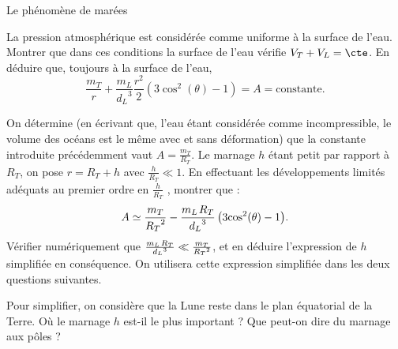 \begin{exo}[PC][1][devoir]{Le phénomène de marées}
\begin{quest}
  \item
  La pression atmosphérique est considérée comme uniforme à la surface de l'eau. Montrer que dans ces conditions la surface de l'eau vérifie $V_T + V_L = \cte$. En déduire que, toujours à la surface de l'eau,
  \begin{equation}
    \frac{{{m_T}}}{r} + \frac{{{m_L}}}{{{d_L}^3}}\frac{{{r^2}}}{2}\left( {3{{\cos }^2}(\theta ) - 1} \right) = A = \text{constante}.
  \end{equation}


  \item On détermine (en écrivant que, l'eau étant considérée comme incompressible, le volume des océans est le même avec et sans déformation) que la constante introduite précédemment vaut $A=\frac{{{m_T}}}{{{R_T}}}$.  Le marnage $h$ étant petit par rapport à $R_T$, on pose $r=R_T+h$ avec $\frac{h}{{{R_T}}} \ll 1$. En effectuant les développements limités adéquats au premier ordre en $\frac{h}{{{R_T}}}$ , montrer que : 
  \begin{equation}
    A \simeq 
      {\frac{{{m_T}}}{{{R_T}^2}} - \frac{{{m_L}{\kern 1pt} {R_T}}}{{{d_L}^3}}\left( {3{{\cos }^2}(\theta ) - 1} \right)}.
  \end{equation}
  Vérifier numériquement que $\frac{{{m_L}{\kern 1pt} {R_T}}}{{{d_L}^3}} \ll \frac{{{m_T}}}{{{R_T}^2}}$, et en déduire l'expression de $h$ simplifiée  en conséquence. On utilisera cette expression simplifiée dans les deux questions suivantes.



  \item Pour simplifier, on considère que la Lune reste dans le plan équatorial de la Terre. Où le marnage $h$ est-il le plus important ? Que peut-on dire du marnage aux pôles ?


\end{quest}
\end{exo}
